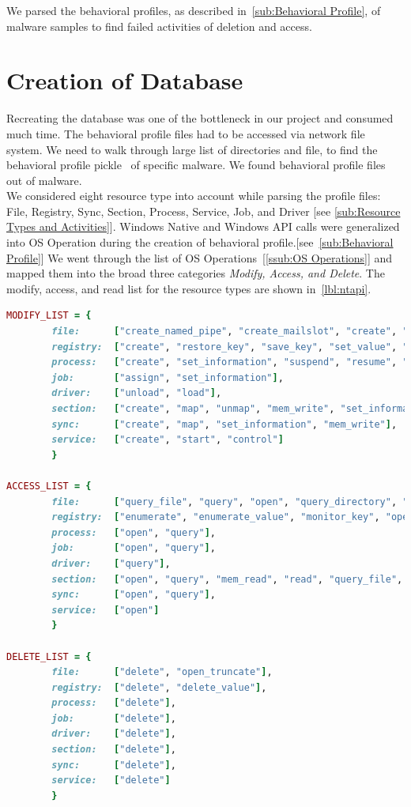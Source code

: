 We parsed the behavioral profiles, as described in~\autoref{sub:Behavioral Profile}, of malware samples to find failed activities of deletion and access.
\section{Creation of Database}
\label{sec:Creation of Database}
Recreating the database was one of the bottleneck in our project and consumed much time.
The behavioral profile files had to be accessed via network file system.
We need to walk through large list of directories and file, to find the behavioral profile pickle~\cite[]{pythonpickle} of specific malware.
We found \emph{\gettotalmalwareii{}} behavioral profile files out of \emph{\gettotalmalwarei{}} malware.\\

We considered eight resource type into account while parsing the profile files: File, Registry, Sync, Section, Process, Service, Job, and Driver [see \autoref{sub:Resource Types and Activities}].
Windows Native and Windows API calls were generalized into OS Operation during the creation of behavioral profile.[see~\autoref{sub:Behavioral Profile}]
We went through the list of OS Operations~[\autoref{ssub:OS Operations}] and mapped them into the broad three categories \emph{Modify, Access, and Delete}.
The modify, access, and read list for the resource types \emph{\getresourcetypes{}} are shown in~\autoref{lbl:ntapi}.


\begin{lstlisting}[numbers=none,language=ruby,caption={Mapping of generalized OS Operation from behavioral profile},label={lbl:ntapi}]
MODIFY_LIST = {
        file:      ["create_named_pipe", "create_mailslot", "create", "rename", "set_information", "write", "flush_buffer", "map"],
        registry:  ["create", "restore_key", "save_key", "set_value", "set_information", "mem_write"],
        process:   ["create", "set_information", "suspend", "resume", "unmap", "map"],
        job:       ["assign", "set_information"],
        driver:    ["unload", "load"],
        section:   ["create", "map", "unmap", "mem_write", "set_information"],
        sync:      ["create", "map", "set_information", "mem_write"],
        service:   ["create", "start", "control"]
        }

ACCESS_LIST = {
        file:      ["query_file", "query", "open", "query_directory", "query_information", "read", "monitor_dir", "query_value"],
        registry:  ["enumerate", "enumerate_value", "monitor_key", "open", "query", "query_value", "mem_read"],
        process:   ["open", "query"],
        job:       ["open", "query"],
        driver:    ["query"],
        section:   ["open", "query", "mem_read", "read", "query_file", "query_system"],
        sync:      ["open", "query"],
        service:   ["open"]
        }

DELETE_LIST = {
        file:      ["delete", "open_truncate"],
        registry:  ["delete", "delete_value"],
        process:   ["delete"],
        job:       ["delete"],
        driver:    ["delete"],
        section:   ["delete"],
        sync:      ["delete"],
        service:   ["delete"]
        }

\end{lstlisting}

